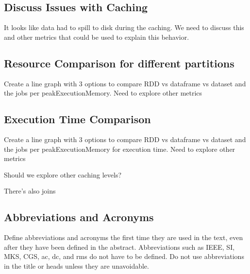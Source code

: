 \documentclass[conference]{IEEEtran}
\begin{document}
\subsection{Discuss Issues with Caching}
It looks like data had to spill to disk during the caching. We need to discuss this and other metrics that could be used
to explain this behavior.

\subsection{Resource Comparison for different partitions}
Create a line graph with 3 options to compare RDD vs dataframe vs dataset and the jobs per peakExecutionMemory.  Need to explore other metrics

\subsection{Execution Time Comparison}
Create a line graph with 3 options to compare RDD vs dataframe vs dataset and the jobs per peakExecutionMemory for execution time. Need to explore other metrics

Should we explore other caching levels?

There's also joins
























\subsection{Abbreviations and Acronyms}\label{AA}
Define abbreviations and acronyms the first time they are used in the text, 
even after they have been defined in the abstract. Abbreviations such as 
IEEE, SI, MKS, CGS, ac, dc, and rms do not have to be defined. Do not use 
abbreviations in the title or heads unless they are unavoidable.
\end{document}
